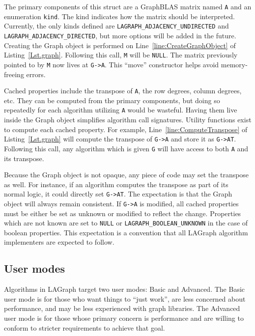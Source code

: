 The primary components of this struct are a GraphBLAS matrix named \verb'A' and an enumeration \verb'kind'.
The kind indicates how the matrix should be interpreted.
Currently, the only kinds defined are \verb'LAGRAPH_ADJACENCY_UNDIRECTED' and 
\verb'LAGRAPH_ADJACENCY_DIRECTED', but more options will be added in the future.  Creating the 
Graph object is performed on Line~\ref{line:CreateGraphObject} of Listing~\ref{Lst.graph}.
Following this call, \verb'M' will be \verb'NULL'. The matrix previously pointed to by \verb'M' now
lives at \verb'G->A'. This ``move'' constructor helps avoid memory-freeing errors.

Cached properties include the transpose of \verb'A', the row degrees, column degrees, etc.
They can be computed from the primary components, but doing so repeatedly for each algorithm
utilizing \verb'A' would be wasteful. Having them live inside the Graph object simplifies
algorithm call signatures. Utility functions exist to compute each cached property.  For example,
Line~\ref{line:ComputeTranspose} of Listing~\ref{Lst.graph} will compute the transpose of \verb'G->A' and store it as \verb'G->AT'.
Following this call, any algorithm which is given \verb'G' will have access to both \verb'A' and its transpose.

Because the Graph object is not opaque, any piece of code may set the transpose as well. For instance, if an algorithm
computes the transpose as part of its normal logic, it could directly set \verb'G->AT'.
The expectation is that the Graph object will always remain consistent.
If \verb'G->A' is modified, all cached properties must be either be set as unknown or modified to reflect the change.
Properties which are not known are set to \verb'NULL' or \verb'LAGRAPH_BOOLEAN_UNKNOWN' in the case of boolean properties.
This expectation is a convention that all LAGraph algorithm implementers are expected to follow.



\subsection{User modes}

Algorithms in LAGraph target two user modes: Basic and Advanced. The Basic user mode is for those who want
things to ``just work'', are less concerned about performance, and may be less experienced with graph libraries.
The Advanced user mode is for those whose primary concern is performance and are willing to conform to stricter
requirements to achieve that goal.

